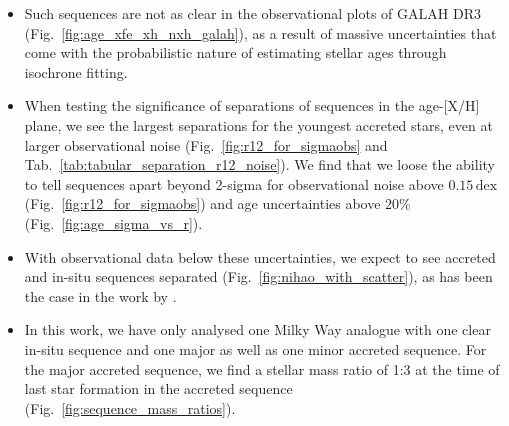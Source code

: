 \documentclass[fleqn,usenatbib]{mnras}
\begin{document}
\begin{itemize}
    \item Such sequences are not as clear in the observational plots of GALAH DR3 (Fig.~\ref{fig:age_xfe_xh_nxh_galah}), as a result of massive uncertainties that come with the probabilistic nature of estimating stellar ages through isochrone fitting.
    \item When testing the significance of separations of sequences in the age-[X/H] plane, we see the largest separations for the youngest accreted stars, even at larger observational noise (Fig.~\ref{fig:r12_for_sigmaobs} and Tab.~\ref{tab:tabular_separation_r12_noise}). We find that we loose the ability to tell sequences apart beyond 2-sigma for observational noise above $0.15\,\mathrm{dex}$ (Fig.~\ref{fig:r12_for_sigmaobs}) and age uncertainties above $20\%$ (Fig.~\ref{fig:age_sigma_vs_r}).
    \item With observational data below these uncertainties, we expect to see accreted and in-situ sequences separated (Fig.~\ref{fig:nihao_with_scatter}), as has been the case in the work by \citet{Xiang2022}.
    \item In this work, we have only analysed one Milky Way analogue with one clear in-situ sequence and one major as well as one minor accreted sequence. For the major accreted sequence, we find a stellar mass ratio of 1:3 at the time of last star formation in the accreted sequence (Fig.~\ref{fig:sequence_mass_ratios}).
\end{itemize}
\end{document}
